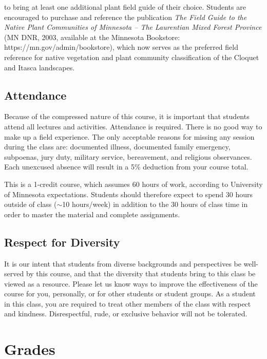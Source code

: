 \documentclass{tufte-handout}
\begin{document}
\begin{fullwidth}
 to bring at least one additional plant field guide of their choice. Students are encouraged to purchase and reference the publication \emph{The Field Guide to the Native Plant Communities of Minnesota – The Laurentian Mixed Forest Province} (MN DNR, 2003, available at the Minnesota Bookstore: https://mn.gov/admin/bookstore), which now serves as the preferred field reference for native vegetation and plant community classification of the Cloquet and Itasca landscapes. 

\subsection{Attendance}

Because of the compressed nature of this course, it is important that students attend all lectures and activities. Attendance is required. There is no good way to make up a field experience. The only acceptable reasons for missing any session during the class are: documented illness, documented family emergency, subpoenas, jury duty, military service, bereavement, and religious observances. Each unexcused absence will result in a 5\% deduction from your course total.

This is a 1-credit course, which assumes 60 hours of work, according to University of Minnesota expectations. Students should therefore expect to spend 30 hours outside of class ($\sim$10 hours/week) in addition to the 30 hours of class time in order to master the material and complete assignments.

\subsection{Respect for Diversity}

It is our intent that students from diverse backgrounds and perspectives be well-served by this course, and that the diversity that students bring to this class be viewed as a resource. Please let us know ways to improve the effectiveness of the course for you, personally, or for other students or student groups. As a student in this class, you are required to treat other members of the class with respect and kindness. Disrespectful, rude, or exclusive behavior will not be tolerated.

\section{Grades}


\end{fullwidth}
\end{document}
